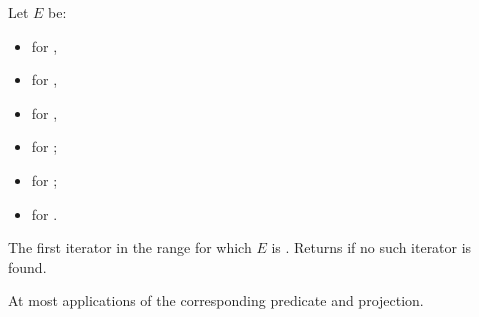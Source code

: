 \begin{itemdescr}
\pnum
Let $E$ be:
\begin{itemize}
\item {} for ,
\item {} for ,
\item {} for ,
\item {} for ;
\item {} for ;
\item {} for .
\end{itemize}

\pnum
\returns
The first iterator  in the range 
for which $E$ is .
Returns  if no such iterator is found.

\pnum
\complexity
At most  applications
of the corresponding predicate and projection.
\end{itemdescr}
